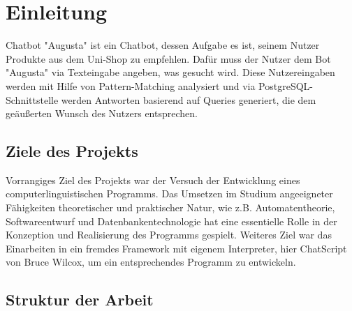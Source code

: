 \chapter{Einleitung}
\label{sec:Einleitung}

Chatbot "Augusta" ist ein Chatbot, dessen Aufgabe es ist, seinem Nutzer Produkte aus dem Uni-Shop zu empfehlen. Dafür muss der Nutzer dem Bot "Augusta" via Texteingabe angeben, was gesucht wird. Diese Nutzereingaben werden mit Hilfe von Pattern-Matching analysiert und via PostgreSQL-Schnittstelle werden Antworten basierend auf Queries generiert, die dem geäußerten Wunsch des Nutzers entsprechen. 

\section{Ziele des Projekts}
\label{sec:ZielDerArbeit}

Vorrangiges Ziel des Projekts war der Versuch der Entwicklung eines computerlinguistischen Programms. Das Umsetzen im Studium angeeigneter Fähigkeiten theoretischer und praktischer Natur, wie z.B. Automatentheorie, Softwareentwurf und Datenbankentechnologie hat eine essentielle Rolle in der Konzeption und Realisierung des Programms gespielt. Weiteres Ziel war das Einarbeiten in ein fremdes Framework mit eigenem Interpreter, hier ChatScript \citep{chatscript2019} von Bruce Wilcox, um ein entsprechendes Programm zu entwickeln. 

\section{Struktur der Arbeit}
\label{sec:Inhaltsbeschreibung} 

